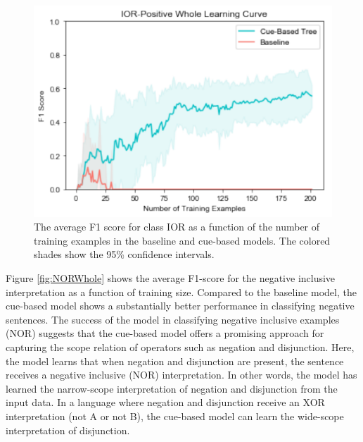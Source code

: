\documentclass[,man,floatsintext]{apa6}
\begin{document}
\begin{figure}
\centering
\includegraphics{figs/IORWhole-1.pdf}
\caption{\label{fig:IORWhole}The average F1 score for class IOR as a function of the number of training examples in the baseline and cue-based models. The colored shades show the 95\% confidence intervals.}
\end{figure}

Figure \ref{fig:NORWhole} shows the average F1-score for the negative inclusive interpretation as a function of training size. Compared to the baseline model, the cue-based model shows a substantially better performance in classifying negative sentences. The success of the model in classifying negative inclusive examples (NOR) suggests that the cue-based model offers a promising approach for capturing the scope relation of operators such as negation and disjunction. Here, the model learns that when negation and disjunction are present, the sentence receives a negative inclusive (NOR) interpretation. In other words, the model has learned the narrow-scope interpretation of negation and disjunction from the input data. In a language where negation and disjunction receive an XOR interpretation (not A or not B), the cue-based model can learn the wide-scope interpretation of disjunction.
\end{document}

